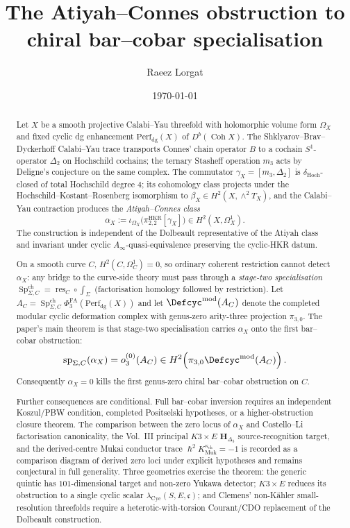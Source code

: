 \documentclass[11pt,reqno]{amsart}
\title[Atiyah--Connes obstruction]{The Atiyah--Connes obstruction to chiral bar--cobar specialisation}
\author{Raeez Lorgat}
\date{\today}
\theoremstyle{plain}
\theoremstyle{definition}
\theoremstyle{remark}
\DeclareMathOperator{\Coh}{Coh}
\DeclareMathOperator{\Sp}{Sp}
\newcommand{\hbar}{{\hslash}}
\begin{document}
\begin{abstract}
Let $X$ be a smooth projective Calabi--Yau threefold with holomorphic
volume form $\Omega_X$ and fixed cyclic dg enhancement
$\mathrm{Perf}_{\mathrm{dg}}(X)$ of $D^b(\Coh X)$. The
Shklyarov--Brav--Dyckerhoff Calabi--Yau trace transports Connes'
chain operator $B$ to a cochain $S^1$-operator $\Delta_2$ on
Hochschild cochains; the ternary Stasheff operation $m_3$ acts by
Deligne's conjecture on the same complex. The commutator
$\gamma_X=[m_3,\Delta_2]$ is $\delta_{\mathrm{Hoch}}$-closed of total
Hochschild degree $4$; its cohomology class projects under the
Hochschild--Kostant--Rosenberg isomorphism to
$\beta_X\in H^2(X,\wedge^2T_X)$, and the Calabi--Yau contraction
produces the \emph{Atiyah--Connes class}
\[
  \alpha_X
  :=
  \iota_{\Omega_X}\bigl(\pi^{\mathrm{HKR}}_{2,2}[\gamma_X]\bigr)
  \in H^2(X,\Omega^1_X).
\]
The construction is independent of the Dolbeault representative of the
Atiyah class and invariant under cyclic $A_\infty$-quasi-equivalence
preserving the cyclic-HKR datum.

On a smooth curve $C$, $H^2(C,\Omega^1_C)=0$, so ordinary coherent
restriction cannot detect $\alpha_X$: any bridge to the curve-side
theory must pass through a \emph{stage-two specialisation}
$\Sp^{\mathrm{ch}}_{\Sigma,C}=\operatorname{res}_C\circ\int_\Sigma$
(factorisation homology followed by restriction). Let
$A_C=\Sp^{\mathrm{ch}}_{\Sigma,C}\Phi^{\mathrm{FA}}_3
(\mathrm{Perf}_{\mathrm{dg}}(X))$ and let
$\Defcyc^{\mathrm{mod}}(A_C)$ denote the completed modular cyclic
deformation complex with genus-zero arity-three projection
$\pi_{3,0}$.  The paper's main theorem is that stage-two
specialisation carries $\alpha_X$ onto the first bar--cobar
obstruction:
\[
  \operatorname{sp}_{\Sigma,C}(\alpha_X)
  =
  o^{(0)}_3(A_C)
  \in H^2\!\left(
    \pi_{3,0}\Defcyc^{\mathrm{mod}}(A_C)
  \right).
\]
Consequently $\alpha_X=0$ kills the first genus-zero chiral
bar--cobar obstruction on $C$.

Further consequences are conditional. Full bar--cobar inversion
requires an independent Koszul/PBW condition, completed Positselski
hypotheses, or a higher-obstruction closure theorem. The comparison
between the zero locus of $\alpha_X$ and Costello--Li factorisation
canonicality, the Vol.~III principal $K3\times E$
$\mathbf H_{\Delta_5}$ source-recognition target, and the
derived-centre Mukai conductor trace
$\hbar^2K^{\kappa_{\mathrm{ch}}}_{\mathrm{Muk}}=-1$ is recorded as a
comparison diagram of derived zero loci under explicit hypotheses and
remains conjectural in full generality. Three geometries exercise the
theorem: the generic quintic has $101$-dimensional target and non-zero
Yukawa detector; $K3\times E$ reduces its obstruction to a single
cyclic scalar $\lambda_{\mathrm{Cyc}}(S,E,\mathfrak c)$; and Clemens'
non-K\"ahler small-resolution threefolds require a heterotic-with-torsion
Courant/CDO replacement of the Dolbeault construction.
\end{abstract}
\end{document}
